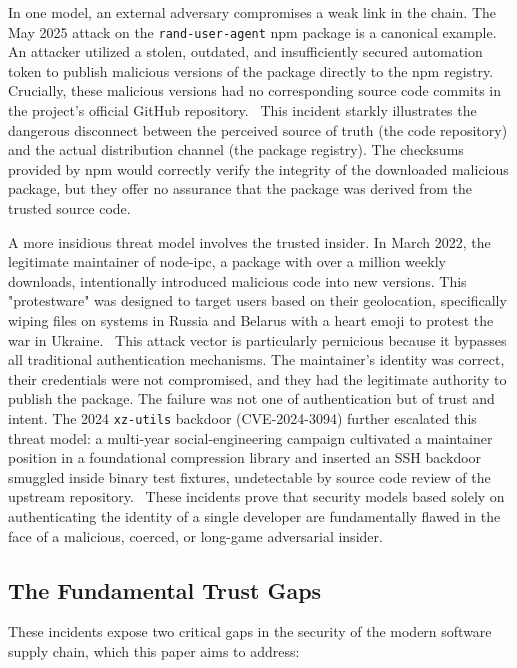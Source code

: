 \documentclass{article}
\begin{document}
In one model, an external adversary compromises a weak link in the chain. The May 2025 attack on the \lstinline{rand-user-agent} npm package is a canonical example. An attacker utilized a stolen, outdated, and insufficiently secured automation token to publish malicious versions of the package directly to the npm registry. Crucially, these malicious versions had no corresponding source code commits in the project's official GitHub repository.~\cite{aikido2025rand} This incident starkly illustrates the dangerous disconnect between the perceived source of truth (the code repository) and the actual distribution channel (the package registry). The checksums provided by npm would correctly verify the integrity of the downloaded malicious package, but they offer no assurance that the package was derived from the trusted source code.

A more insidious threat model involves the trusted insider. In March 2022, the legitimate maintainer of node-ipc, a package with over a million weekly downloads, intentionally introduced malicious code into new versions. This "protestware" was designed to target users based on their geolocation, specifically wiping files on systems in Russia and Belarus with a heart emoji to protest the war in Ukraine.~\cite{cve-2022-23812} This attack vector is particularly pernicious because it bypasses all traditional authentication mechanisms. The maintainer's identity was correct, their credentials were not compromised, and they had the legitimate authority to publish the package. The failure was not one of authentication but of trust and intent. The 2024 \lstinline{xz-utils} backdoor (CVE-2024-3094) further escalated this threat model: a multi-year social-engineering campaign cultivated a maintainer position in a foundational compression library and inserted an SSH backdoor smuggled inside binary test fixtures, undetectable by source code review of the upstream repository.~\cite{freund2024xz,cve-2024-3094} These incidents prove that security models based solely on authenticating the identity of a single developer are fundamentally flawed in the face of a malicious, coerced, or long-game adversarial insider.

\subsection{The Fundamental Trust Gaps}

These incidents expose two critical gaps in the security of the modern software supply chain, which this paper aims to address:
\end{document}
